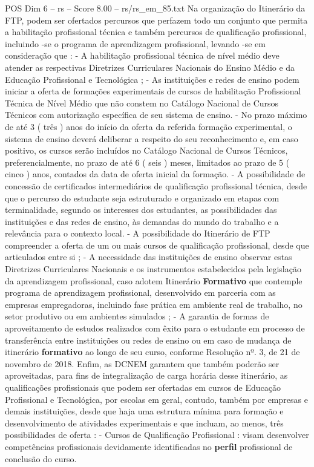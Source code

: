 \begin{textsample}{POS Dim 6 – rs – Score 8.00 – rs/rs\_em\_85.txt}
Na organização do Itinerário da FTP, podem ser ofertados percursos que perfazem todo um conjunto que permita a habilitação profissional técnica e também percursos de qualificação profissional, incluindo -se o programa de aprendizagem profissional, levando -se em consideração que : - A habilitação profissional técnica de nível médio deve atender as respectivas Diretrizes Curriculares Nacionais do Ensino Médio e da Educação Profissional e Tecnológica ; - As instituições e redes de ensino podem iniciar a oferta de formações experimentais de cursos de habilitação Profissional Técnica de Nível Médio que não constem no Catálogo Nacional de Cursos Técnicos com autorização específica de seu sistema de ensino. - No prazo máximo de até 3 ( três ) anos do início da oferta da referida formação experimental, o sistema de ensino deverá deliberar a respeito do seu reconhecimento e, em caso positivo, os cursos serão incluídos no Catálogo Nacional de Cursos Técnicos, preferencialmente, no prazo de até 6 ( seis ) meses, limitados ao prazo de 5 ( cinco ) anos, contados da data de oferta inicial da formação. - A possibilidade de concessão de certificados intermediários de qualificação profissional técnica, desde que o percurso do estudante seja estruturado e organizado em etapas com terminalidade, segundo os interesses dos estudantes, as possibilidades das instituições e das redes de ensino, às demandas do mundo do trabalho e a relevância para o contexto local. - A possibilidade do Itinerário de FTP compreender a oferta de um ou mais cursos de qualificação profissional, desde que articulados entre si ; - A necessidade das instituições de ensino observar estas Diretrizes Curriculares Nacionais e os instrumentos estabelecidos pela legislação da aprendizagem profissional, caso adotem Itinerário \textbf{Formativo} que contemple programa de aprendizagem profissional, desenvolvido em parceria com as empresas empregadoras, incluindo fase prática em ambiente real de trabalho, no setor produtivo ou em ambientes simulados ; - A garantia de formas de aproveitamento de estudos realizados com êxito para o estudante em processo de transferência entre instituições ou redes de ensino ou em caso de mudança de itinerário \textbf{formativo} ao longo de seu curso, conforme Resolução nº. 3, de 21 de novembro de 2018.
Enfim, as DCNEM garantem que também poderão ser aproveitadas, para fins de integralização de carga horária desse itinerário, as qualificações profissionais que podem ser ofertadas em cursos de Educação Profissional e Tecnológica, por escolas em geral, contudo, também por empresas e demais instituições, desde que haja uma estrutura mínima para formação e desenvolvimento de atividades experimentais e que incluam, ao menos, três possibilidades de oferta : - Cursos de Qualificação Profissional : visam desenvolver competências profissionais devidamente identificadas no \textbf{perfil} profissional de conclusão do curso.

\end{textsample}
